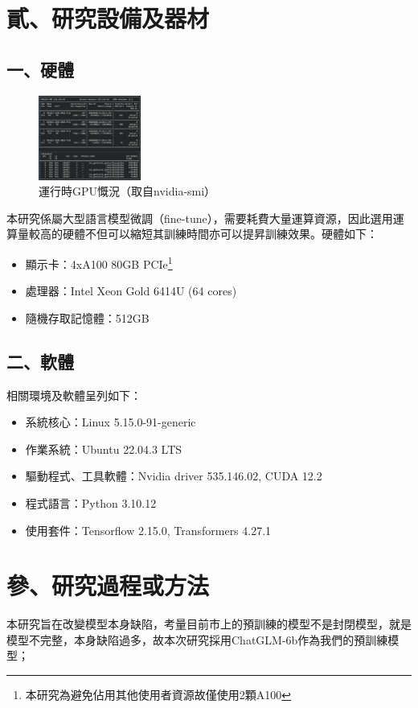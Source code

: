 \documentclass[8pt,a4paper,MingLiU,UTF8]{article}
\begin{document}
	\section{貳、研究設備及器材}
	\subsection{一、硬體}
		\begin{figure}
		\centering
		\includegraphics[width=0.3\textwidth]{nividiasmi}
		\caption{運行時GPU慨況（取自nvidia-smi）}
	\end{figure}
	
	本研究係屬大型語言模型微調（fine-tune），需要耗費大量運算資源，因此選用運算量較高的硬體不但可以縮短其訓練時間亦可以提昇訓練效果。硬體如下：
	

	\begin{itemize}
		\item 顯示卡：4xA100 80GB PCIe\footnote{本研究為避免佔用其他使用者資源故僅使用2顆A100}
		\item 處理器：Intel Xeon Gold 6414U (64 cores)
		\item 隨機存取記憶體：512GB
	\end{itemize}


	\subsection{二、軟體}
	相關環境及軟體呈列如下：
	\begin{itemize}
		\item 系統核心：Linux 5.15.0-91-generic
		\item 作業系統：Ubuntu 22.04.3 LTS
		\item 驅動程式、工具軟體：Nvidia driver 535.146.02, CUDA 12.2
		\item 程式語言：Python 3.10.12
		\item 使用套件：Tensorflow 2.15.0, Transformers 4.27.1
	\end{itemize}
	\section{參、研究過程或方法}
	本研究旨在改變模型本身缺陷，考量目前市上的預訓練的模型不是封閉模型，就是模型不完整，本身缺陷過多，故本次研究採用ChatGLM-6b作為我們的預訓練模型；
\end{document}
